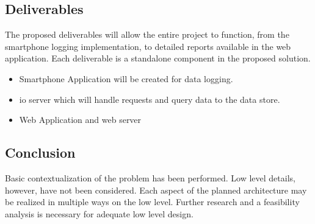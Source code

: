 \subsection{Deliverables}
The proposed deliverables will allow the entire project to function, from the smartphone logging implementation, to detailed reports available in the web application. 
Each deliverable is a standalone component in the proposed solution.
\begin{itemize}
\item Smartphone Application will be created for data logging.
\item \Ac{io} server which will handle requests and query data to the data store.
\item Web Application and web server
\end{itemize}

\subsection{Conclusion}
Basic contextualization of the problem has been performed.
Low level details, however, have not been considered.
Each aspect of the planned architecture may be realized in multiple ways on the low level.
Further research and a feasibility analysis is necessary for adequate low level design.

\pagebreak
